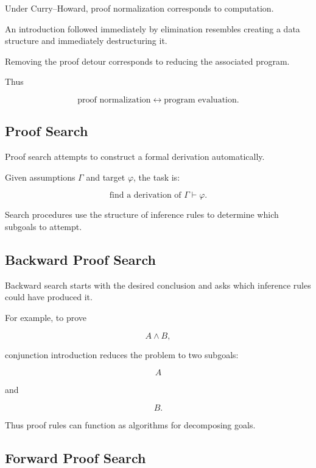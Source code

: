 Under Curry--Howard, proof normalization corresponds to computation.

An introduction followed immediately by elimination resembles creating a
data structure and immediately destructuring it.

Removing the proof detour corresponds to reducing the associated program.

Thus

\[
\boxed{
\text{proof normalization}
\leftrightarrow
\text{program evaluation}.
}
\]

\subsection{Proof Search}
\label{subsec:proof-theory-proof-search}

Proof search attempts to construct a formal derivation automatically.

Given assumptions \(\Gamma\) and target \(\varphi\), the task is:

\[
\boxed{
\text{find a derivation of }
\Gamma\vdash\varphi.
}
\]

Search procedures use the structure of inference rules to determine which
subgoals to attempt.

\subsection{Backward Proof Search}
\label{subsec:backward-proof-search}

Backward search starts with the desired conclusion and asks which inference
rules could have produced it.

For example, to prove

\[
A\land B,
\]

conjunction introduction reduces the problem to two subgoals:

\[
\boxed{
A
}
\]

and

\[
\boxed{
B.
}
\]

Thus proof rules can function as algorithms for decomposing goals.

\subsection{Forward Proof Search}
\label{subsec:forward-proof-search}

